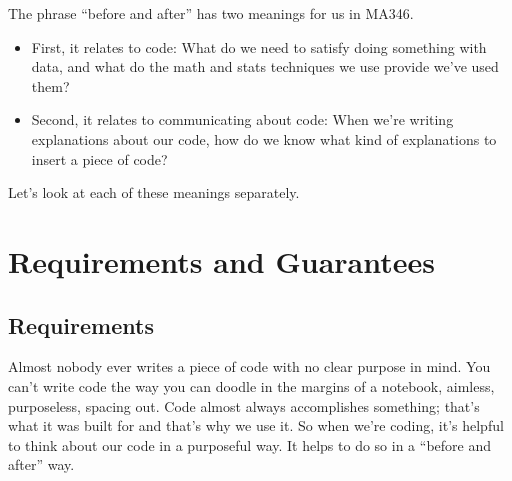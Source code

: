 \documentclass[letterpaper,10pt,english]{jupyterBook}
\begin{document}
\sphinxAtStartPar
The phrase “before and after” has two meanings for us in MA346.
\begin{itemize}
\item {} 
\sphinxAtStartPar
First, it relates to code:  What  do we need to satisfy  doing something with data, and what  do the math and stats techniques we use provide  we’ve used them?

\item {} 
\sphinxAtStartPar
Second, it relates to communicating about code:  When we’re writing explanations about our code, how do we know what kind of explanations to insert  a piece of code?

\end{itemize}

\sphinxAtStartPar
Let’s look at each of these meanings separately.


\section{Requirements and Guarantees}
\label{\detokenize{chapter-5-before-and-after:requirements-and-guarantees}}

\subsection{Requirements}
\label{\detokenize{chapter-5-before-and-after:requirements}}
\sphinxAtStartPar
Almost nobody ever writes a piece of code with no clear purpose in mind.  You can’t write code the way you can doodle in the margins of a notebook, aimless, purposeless, spacing out.  Code almost always accomplishes something; that’s what it was built for and that’s why we use it.  So when we’re coding, it’s helpful to think about our code in a purposeful way.  It helps to do so in a “before and after” way.
\end{document}
